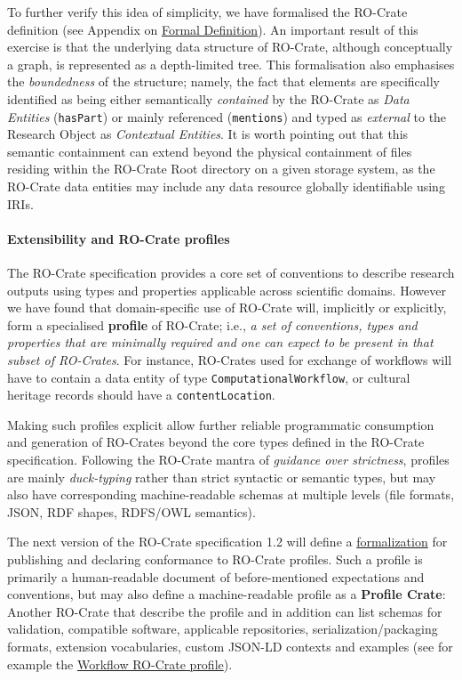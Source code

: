 To further verify this idea of simplicity, we have formalised the
RO-Crate definition (see Appendix on
\protect\hyperlink{formaldefinition}{Formal Definition}). An important
result of this exercise is that the underlying data structure of
RO-Crate, although conceptually a graph, is represented as a
depth-limited tree. This formalisation also emphasises the
\emph{boundedness} of the structure; namely, the fact that elements are
specifically identified as being either semantically \emph{contained} by
the RO-Crate as \emph{Data Entities} (\texttt{hasPart}) or mainly
referenced (\texttt{mentions}) and typed as \emph{external} to the
Research Object as \emph{Contextual Entities}. It is worth pointing out
that this semantic containment can extend beyond the physical
containment of files residing within the RO-Crate Root directory on a
given storage system, as the RO-Crate data entities may include any data
resource globally identifiable using IRIs.

\hypertarget{profiles}{%
\paragraph{Extensibility and RO-Crate profiles}\label{profiles}}

The RO-Crate specification provides a core set of conventions to
describe research outputs using types and properties applicable across
scientific domains. However we have found that domain-specific use of
RO-Crate will, implicitly or explicitly, form a specialised
\textbf{profile} of RO-Crate; i.e., \emph{a set of conventions, types
and properties that are minimally required and one can expect to be
present in that subset of RO-Crates}. For instance, RO-Crates used for
exchange of workflows will have to contain a data entity of type
\texttt{ComputationalWorkflow}, or cultural heritage records should have
a \texttt{contentLocation}.

Making such profiles explicit allow further reliable programmatic
consumption and generation of RO-Crates beyond the core types defined in
the RO-Crate specification. Following the RO-Crate mantra of
\emph{guidance over strictness}, profiles are mainly \emph{duck-typing}
rather than strict syntactic or semantic types, but may also have
corresponding machine-readable schemas at multiple levels (file formats,
JSON, RDF shapes, RDFS/OWL semantics).

The next version of the RO-Crate specification 1.2 will define a
\href{https://www.researchobject.org/ro-crate/1.2-DRAFT/profiles}{formalization}
for publishing and declaring conformance to RO-Crate profiles. Such a
profile is primarily a human-readable document of before-mentioned
expectations and conventions, but may also define a machine-readable
profile as a \textbf{Profile Crate}: Another RO-Crate that describe the
profile and in addition can list schemas for validation, compatible
software, applicable repositories, serialization/packaging formats,
extension vocabularies, custom JSON-LD contexts and examples (see for
example the
\href{https://w3id.org/workflowhub/workflow-ro-crate/}{Workflow RO-Crate
profile}).

